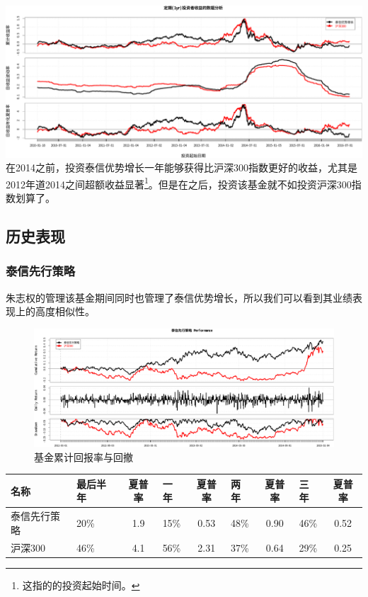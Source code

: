 \documentclass[hyperref,]{ctexart}
\begin{document}
\includegraphics{zzq-detail_files/figure-latex/unnamed-chunk-5-1.pdf}
在2014之前，投资泰信优势增长一年能够获得比沪深300指数更好的收益，尤其是2012年道2014之间超额收益显著\footnote{这指的的投资起始时间。}。但是在之后，投资该基金就不如投资沪深300指数划算了。

\subsection{历史表现}

\subsubsection{泰信先行策略}

朱志权的管理该基金期间同时也管理了泰信优势增长，所以我们可以看到其业绩表现上的高度相似性。

\begin{figure}[htbp]
\centering
\includegraphics{zzq-detail_files/figure-latex/unnamed-chunk-6-1.pdf}
\caption{基金累计回报率与回撤}
\end{figure}

\begin{longtable}[]{@{}llclclclc@{}}
\toprule
名称 & 最后半年 & 夏普率 & 一年 & 夏普率 & 两年 & 夏普率 & 三年 &
夏普率\tabularnewline
\midrule
\endhead
泰信先行策略 & 20\% & 1.9 & 15\% & 0.53 & 48\% & 0.90 & 46\% &
0.52\tabularnewline
沪深300 & 46\% & 4.1 & 56\% & 2.31 & 37\% & 0.64 & 29\% &
0.25\tabularnewline
\bottomrule
\end{longtable}
\end{document}
